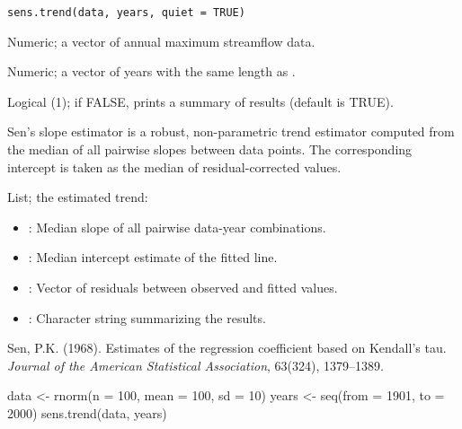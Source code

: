 \documentclass[a4paper]{book}
\begin{document}
%
\begin{Usage}
\begin{verbatim}
sens.trend(data, years, quiet = TRUE)
\end{verbatim}
\end{Usage}
%
\begin{Arguments}
\begin{ldescription}
\item[\code{data}] Numeric; a vector of annual maximum streamflow data.

\item[\code{years}] Numeric; a vector of years with the same length as .

\item[\code{quiet}] Logical (1); if FALSE, prints a summary of results (default is TRUE).
\end{ldescription}
\end{Arguments}
%
\begin{Details}
Sen's slope estimator is a robust, non-parametric trend estimator computed from the median
of all pairwise slopes between data points. The corresponding intercept is taken as the
median of residual-corrected values.
\end{Details}
%
\begin{Value}
List; the estimated trend:
\begin{itemize}

\item{} : Median slope of all pairwise data-year combinations.
\item{} : Median intercept estimate of the fitted line.
\item{} : Vector of residuals between observed and fitted values.
\item{} : Character string summarizing the results.

\end{itemize}

\end{Value}
%
\begin{References}
Sen, P.K. (1968). Estimates of the regression coefficient based on Kendall's tau.
\emph{Journal of the American Statistical Association}, 63(324), 1379–1389.
\end{References}
%
\begin{SeeAlso}
\end{SeeAlso}
%
\begin{Examples}
\begin{ExampleCode}
data <- rnorm(n = 100, mean = 100, sd = 10)
years <- seq(from = 1901, to = 2000)
sens.trend(data, years)

\end{ExampleCode}
\end{Examples}
\end{document}
